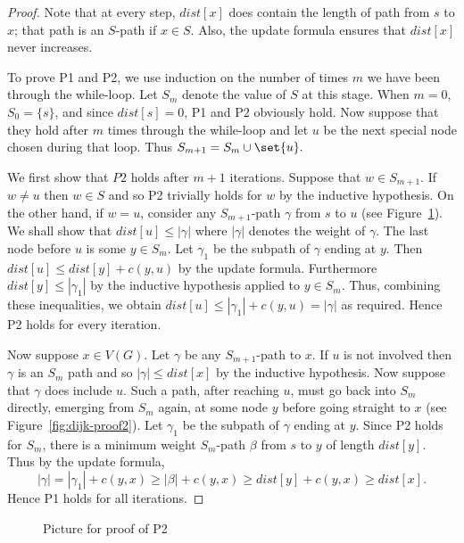 \begin{proof} 
Note that at every step, $dist[x]$ does contain the length of  path from $s$ to $x$; that path is an $S$-path if $x\in S$. Also, the update formula ensures that $dist[x]$ never increases. 

To prove P1 and P2, we use induction on the number of times $m$ we have been through the while-loop. Let $S_m$ denote the value of $S$ at this stage. When $m=0$, $S_0=\{s\}$, and since $dist[s]=0$,
P1 and P2 obviously hold. Now suppose that they hold after $m$ times through the while-loop and let $u$ be the next special node chosen during that loop. Thus $S_{m+1} = S_m \cup \set{u}.$ 

We first show that $P2$ holds after $m+1$ iterations. Suppose that $w\in S_{m+1}$.  If $w\neq u$ then $w\in S$ and so P2 trivially holds for $w$ by the inductive hypothesis. On the other hand, if $w=u$, consider any $S_{m+1}$-path $\gamma$ from $s$ to $u$ (see Figure~\ref{fig:dijk-proof1}). We shall show that $dist[u] \leq |\gamma |$ where $| \gamma | $ denotes the weight of $\gamma$. The last node before $u$ is some $y\in S_m$. Let $\gamma_1$ be the subpath of $\gamma$ ending at $y$. Then $dist[u] \leq dist[y] + c(y,u)$ by the update formula. Furthermore $dist[y] \leq |\gamma_1 |$ by the inductive hypothesis applied to $y\in S_m$. Thus, combining these inequalities, we obtain $dist[u] \leq |\gamma_1 | + c(y, u) = | \gamma |$ as required. Hence P2 holds for every iteration.

Now suppose $x\in V(G)$. Let $\gamma$ be any $S_{m+1}$-path to $x$. If $u$ is not involved then $\gamma$ is an $S_m$ path and so $|\gamma| \leq dist[x]$ by the inductive hypothesis. Now suppose that $\gamma$ does include $u$. Such a path, after reaching $u$, must go back into $S_m$ directly, emerging from $S_m$ again, at some node $y$ before
going straight to $x$ (see Figure~\ref{fig:dijk-proof2}). Let $\gamma_1$ be the subpath of $\gamma$ ending at $y$. Since P2 holds for $S_m$, there is a minimum weight $S_m$-path $\beta$ from $s$ to $y$ of length $dist[y]$. Thus by the update formula, 
$$|\gamma| = |\gamma_1| + c(y, x) \geq |\beta| + c(y, x) \geq dist[y] + c(y, x) \geq dist[x].$$ Hence P1 holds for all iterations.

\end{proof}

\begin{figure}

\caption{Picture for proof of P2}
\label{fig:dijk-proof1}

\end{figure}

